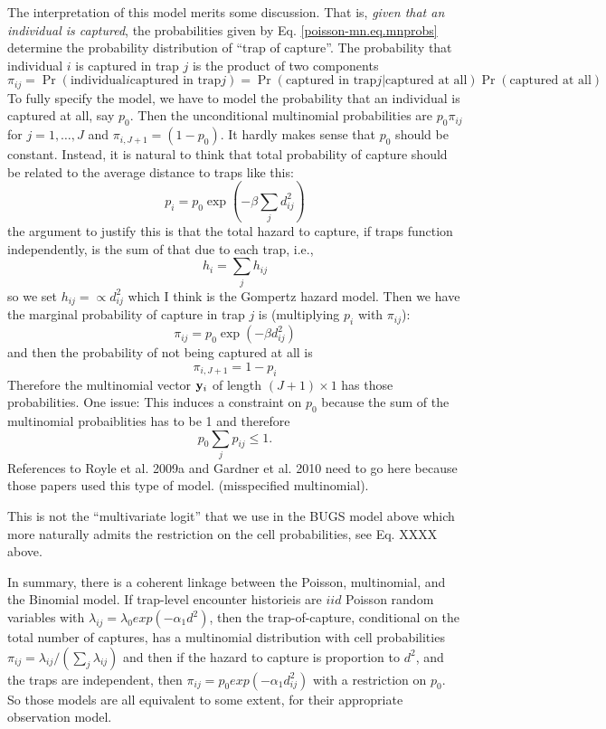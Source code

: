 The interpretation of this model merits some discussion. That is, {\it
  given that an individual is captured}, the probabilities given by
Eq. \ref{poisson-mn.eq.mnprobs} determine the probability distribution
of ``trap of capture''.  The probability that individual $i$ is
captured in trap $j$ is the product of two components
\[
\pi_{ij} = \Pr(\mbox{individual} i \mbox{captured in trap} j) = 
 \Pr(\mbox{captured in trap} j | \mbox{captured at all})\Pr(\mbox{captured at all})
\]
To fully specify the model, we have to
model the probability that an individual is captured at all, say
$p_0$. Then the unconditional multinomial probabilities are
$p_{0} \pi_{ij}$ for $j=1,\ldots,J$ and $\pi_{i,J+1} = (1-p_{0})$.
It hardly makes sense that $p_{0}$ should be constant.
Instead, it is natural to think that total probability of capture should be related
to the average distance to traps like this:
\[
 p_{i} = p_{0} \exp(-\beta \sum_{j} d_{ij}^2)
\]
the argument to justify this is that the total hazard to capture, if
traps function independently, is the sum of that due to each trap, i.e.,
\[
 h_{i} = \sum_{j} h_{ij}
\]
so we set $h_{ij} = \propto d_{ij}^{2}$ which I think is the Gompertz
hazard model.  
Then we have the marginal probability of capture in trap $j$ is
(multiplying $p_{i}$ with $\pi_{ij}$):
\[
\pi_{ij} =   p_{0}  \exp(-\beta d_{ij}^2)
\]
and then the probability of not being captured at all is 
\[
 \pi_{i,J+1} =  1-p_i 
\]
Therefore the multinomial vector ${\bf y}_{i}$ of length  $(J+1)
\times 1$ has those probabilities.  One issue: This induces a
constraint on $p_{0}$ because the sum of the multinomial probaiblities
has to be 1 and therefore 
\[
p_{0} \sum_{j} p_{ij} \le 1.
\]
References to Royle et al. 2009a and Gardner et al. 2010 need to go
here because those papers used this type of model. (misspecified
multinomial). 

This is not the ``multivariate logit'' that
we use in the BUGS model above which more naturally admits the
restriction on the cell probabilities, see Eq. XXXX above.  

In summary, there is a coherent linkage between the Poisson,
multinomial, and the Binomial model. If trap-level encounter
historieis are $iid$ Poisson random variables with $\lambda_{ij} =
\lambda_{0}exp(-\alpha_{1} d^{2})$, then the trap-of-capture,
conditional on the total number of captures, has a multinomial
distribution with cell probabilities $\pi_{ij} =
\lambda_{ij}/(\sum_{j} \lambda_{ij})$ and then if the hazard to
capture is proportion to $d^{2}$, and the traps are independent, then
$\pi_{ij} = p_{0} exp(-\alpha_{1} d_{ij}^{2})$ with a restriction on
$p_{0}$.  So those models are all
equivalent to some extent, for their appropriate observation model.



